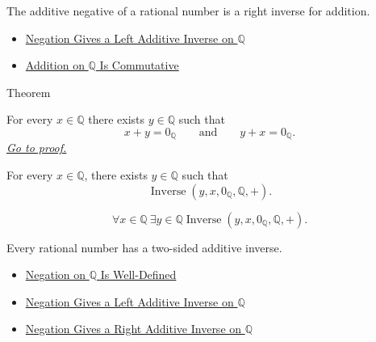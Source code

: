 \begin{remark*}[Interpretation]
The additive negative of a rational number is a right inverse for addition.
\end{remark*}

\begin{dependencies}
\begin{itemize}
  \item \hyperref[thm:negation-left-additive-inverse-on-q]{Negation Gives a Left Additive Inverse on $\mathbb{Q}$}
  \item \hyperref[thm:addition-on-q-commutative]{Addition on $\mathbb{Q}$ Is Commutative}
\end{itemize}
\end{dependencies}

\begin{theorembox}{Theorem}
\begin{theorem}
\label{thm:every-rational-has-additive-inverse}
For every $x\in\mathbb{Q}$ there exists $y\in\mathbb{Q}$ such that
\[
x+y=0_{\mathbb{Q}}
\qquad\text{and}\qquad
y+x=0_{\mathbb{Q}}.
\]
\hyperref[prf:every-rational-has-additive-inverse]{\textit{Go to proof.}}
\end{theorem}
\end{theorembox}

\begin{remark*}
For every $x\in\mathbb{Q}$, there exists $y\in\mathbb{Q}$ such that
\[
\operatorname{Inverse}(y,x,0_{\mathbb{Q}},\mathbb{Q},+).
\]
\end{remark*}

\begin{remark*}
\[
\forall x\in\mathbb{Q}\ \exists y\in\mathbb{Q}
\operatorname{Inverse}(y,x,0_{\mathbb{Q}},\mathbb{Q},+).
\]
\end{remark*}

\begin{remark*}[Interpretation]
Every rational number has a two-sided additive inverse.
\end{remark*}

\begin{dependencies}
\begin{itemize}
  \item \hyperref[thm:negation-on-q-well-defined]{Negation on $\mathbb{Q}$ Is Well-Defined}
  \item \hyperref[thm:negation-left-additive-inverse-on-q]{Negation Gives a Left Additive Inverse on $\mathbb{Q}$}
  \item \hyperref[cor:negation-right-additive-inverse-on-q]{Negation Gives a Right Additive Inverse on $\mathbb{Q}$}
\end{itemize}
\end{dependencies}


